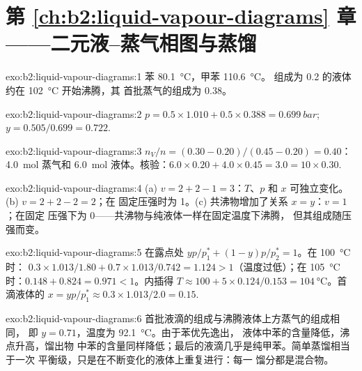 \section*{第 \ref{ch:b2:liquid-vapour-diagrams} 章——二元液–蒸气相图与蒸馏}

\begin{solution}{exo:b2:liquid-vapour-diagrams:1}
苯 \qty{80.1}{\degreeCelsius}，甲苯 \qty{110.6}{\degreeCelsius}。
组成为 0.2 的液体约在 \qty{102}{\degreeCelsius} 开始沸腾，其
首批蒸气的组成为 0.38。
\end{solution}

\begin{solution}{exo:b2:liquid-vapour-diagrams:2}
$p = 0.5 \times 1.010 + 0.5 \times 0.388 = \qty{0.699}{bar}$;
$y = 0.505/0.699 = 0.722$.
\end{solution}

\begin{solution}{exo:b2:liquid-vapour-diagrams:3}
$n_V/n = (0.30 - 0.20)/(0.45 - 0.20) = 0.40$：\qty{4.0}{mol} 蒸气和
\qty{6.0}{mol} 液体。核验：$6.0 \times 0.20 + 4.0 \times 0.45 = 3.0 = 10
\times 0.30$.
\end{solution}

\begin{solution}{exo:b2:liquid-vapour-diagrams:4}
(a) $v = 2 + 2 - 1 = 3$：$T$、$p$ 和 $x$ 可独立变化。(b) $v = 2 + 2 - 2 = 2$；在
固定压强时为 1。(c) 共沸物增加了关系 $x = y$：$v = 1$；在固定
压强下为 0——共沸物与纯液体一样在固定温度下沸腾，
但其组成随压强而变。
\end{solution}

\begin{solution}{exo:b2:liquid-vapour-diagrams:5}
在露点处 $yp/p_1^* + (1 - y)p/p_2^* = 1$。在 \qty{100}{\degreeCelsius} 时：
$0.3 \times 1.013/1.80 + 0.7 \times 1.013/0.742 = 1.124 > 1$（温度过低）；在
\qty{105}{\degreeCelsius} 时：$0.148 + 0.824 = 0.971 < 1$。内插得 $T \approx
100 + 5 \times 0.124/0.153 = \qty{104}{\degreeCelsius}$。首滴液体的 $x =
yp/p_1^* \approx 0.3 \times 1.013/2.0 = 0.15$.
\end{solution}

\begin{solution}{exo:b2:liquid-vapour-diagrams:6}
首批液滴的组成与沸腾液体上方蒸气的组成相同，
即 $y = 0.71$，温度为 \qty{92.1}{\degreeCelsius}。由于苯优先逸出，
液体中苯的含量降低，沸点升高，馏出物
中苯的含量同样降低；最后的液滴几乎是纯甲苯。简单蒸馏相当于一次
平衡级，只是在不断变化的液体上重复进行：每一
馏分都是混合物。
\end{solution}

